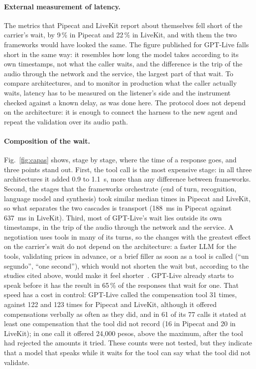 \documentclass[11pt]{article}
\newcommand{\RAutCompSinHerrA}{16}
\newcommand{\RAutCompSinHerrB}{20}
\newcommand{\RAutCompSinHerrC}{61}
\newcommand{\RAutLlamadasC}{77}
\newcommand{\RAutSobreMaxMontoC}{24{,}000}
\newcommand{\RFuncCompensaA}{122}
\newcommand{\RFuncCompensaB}{123}
\newcommand{\RFuncCompensaC}{31}
\newcommand{\RHerrFrac}{65}
\newcommand{\RPropiaFaltaPctA}{9}
\newcommand{\RPropiaFaltaPctB}{22}
\newcommand{\RRtDeltaMax}{1.1}
\newcommand{\RRtDeltaMin}{0.9}
\newcommand{\RTransporteA}{188}
\newcommand{\RTransporteB}{637}
\begin{document}
\paragraph{External measurement of latency.} The metrics that Pipecat and
LiveKit report about themselves fell short of the carrier's wait, by \RPropiaFaltaPctA\,\% in Pipecat and
\RPropiaFaltaPctB\,\% in LiveKit, and with them the two frameworks would have looked
the same. The figure published for GPT-Live falls short in the same way: it resembles
how long the model takes according to its own timestamps, not what the caller waits,
and the difference is the trip of the audio through the network and the service, the
largest part of that wait. To compare architectures, and to
monitor in production what the caller actually waits, latency has to be measured on
the listener's side and the instrument checked against a known delay, as was done
here. The protocol does not depend on the architecture: it is enough to connect the
harness to the new agent and repeat the validation over its audio path.

\paragraph{Composition of the wait.} Fig.~\ref{fig:capas} shows, stage by stage, where the time of a response goes, and three points stand out.
First, the tool call is the most expensive stage: in all three architectures it added \RRtDeltaMin{} to \RRtDeltaMax~s, more than any difference between frameworks.
Second, the stages that the frameworks orchestrate (end of turn, recognition, language model and synthesis) took similar median times in Pipecat and LiveKit, so what separates the two cascades is transport (\RTransporteA~ms in Pipecat against \RTransporteB~ms in LiveKit).
Third, most of GPT-Live's wait lies outside its own timestamps, in the trip of the audio through the network and the service.
A negotiation uses tools in many of its turns, so the changes with the greatest effect on the carrier's wait do not depend on the architecture: a faster LLM for the tools, validating prices in advance, or a brief filler as soon as a tool is called (``un segundo'', ``one second''), which would not shorten the wait but, according to the studies cited above, would make it feel shorter~\cite{maslych2025,gonzales2025}.
GPT-Live already starts to speak before it has the result in
\RHerrFrac\,\% of the responses that wait for one. That speed has a cost in control:
GPT-Live called the compensation tool \RFuncCompensaC{} times, against
\RFuncCompensaA{} and \RFuncCompensaB{} times for Pipecat and LiveKit, although it
offered compensations verbally as often as they did, and in \RAutCompSinHerrC{} of its
\RAutLlamadasC{} calls it stated at least one compensation that the tool did not record
(\RAutCompSinHerrA{} in Pipecat and \RAutCompSinHerrB{} in LiveKit); in one call it
offered \RAutSobreMaxMontoC{} pesos, above the maximum, after the tool had rejected the
amounts it tried. These counts were not tested, but they indicate that a model that
speaks while it waits for the tool can say what the tool did not validate.
\end{document}
